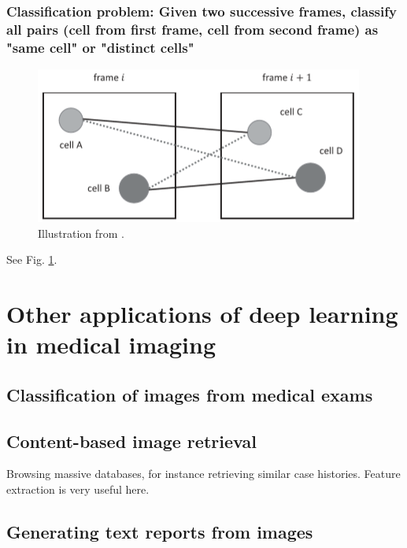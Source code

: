 \documentclass[11pt]{article} %
\begin{document}
    \subsubsection{Classification problem: Given two successive frames, classify all pairs (cell from first frame, cell from second frame) as "same cell" or "distinct cells" \cite{kan:machine}}
\begin{figure}[h!]
  \centering
  \includegraphics[width=.75 \linewidth ]{tracking.png}
  \caption{Illustration from \cite{kan:machine}.}
  \label{fig:tracking}
\end{figure}
See Fig. \ref{fig:tracking}.




\section{Other applications of deep learning in medical imaging \cite{litjens:deeplearning}}
  \subsection{Classification of images from medical exams}
  \subsection{Content-based image retrieval}
    Browsing massive databases, for instance retrieving similar case histories. Feature extraction is very useful here.
  \subsection{Generating text reports from images \cite{schlegl:text}}
\end{document}
